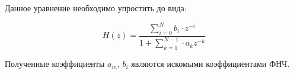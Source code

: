 Данное уравнение необходимо упростить до вида:

\begin{equation}
    \label{eq:domain:canonHz}
    H(z)=\frac{\sum_{i=0}^{N}b_{i}\cdot z^{-i}}{1+\sum_{k=1}^{N-1}\cdot a_{k}z^{-k}}
    \end{equation}

Полученные коэффициенты $a_{m}$, $b_{i}$ являются искомыми коэффициентами ФНЧ. %




